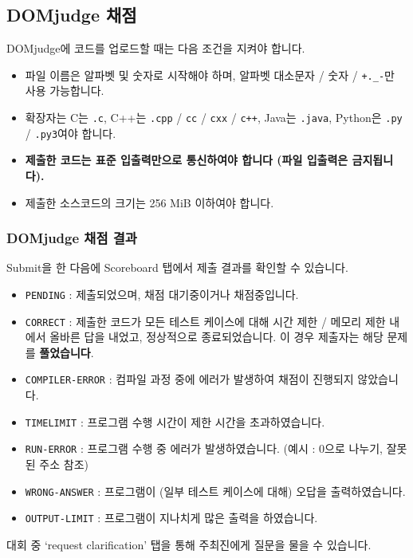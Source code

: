 \subsection*{DOMjudge 채점}
DOMjudge에 코드를 업로드할 때는 다음 조건을 지켜야 합니다.
\begin{itemize}
    \item 파일 이름은 알파벳 및 숫자로 시작해야 하며, 알파벳 대소문자 / 숫자 / \verb|+._-|만 사용 가능합니다.
    \item 확장자는 C는 \verb|.c|, C++는 \verb|.cpp| / \verb|cc| /  \verb|cxx| / \verb|c++|, Java는 \verb|.java|, Python은 \verb|.py| / \verb|.py3|여야 합니다.
    \item \textbf{제출한 코드는 표준 입출력만으로 통신하여야 합니다 (파일 입출력은 금지됩니다).}
    \item 제출한 소스코드의 크기는 256 MiB 이하여야 합니다.
\end{itemize}

\subsubsection*{DOMjudge 채점 결과}
Submit을 한 다음에 Scoreboard 탭에서 제출 결과를 확인할 수 있습니다.
\begin{itemize}
    \item {\color{gray}\texttt{PENDING}} : 제출되었으며, 채점 대기중이거나 채점중입니다.
    \item {\color{my-green}\texttt{CORRECT}} : 제출한 코드가 모든 테스트 케이스에 대해 시간 제한 / 메모리 제한 내에서 올바른 답을 내었고, 정상적으로 종료되었습니다. 이 경우 제출자는 해당 문제를 \textbf{풀었습니다}.
    \item {\color{red}\texttt{COMPILER-ERROR}} : 컴파일 과정 중에 에러가 발생하여 채점이 진행되지 않았습니다.
    \item {\color{red}\texttt{TIMELIMIT}} : 프로그램 수행 시간이 제한 시간을 초과하였습니다.
    \item {\color{red}\texttt{RUN-ERROR}} : 프로그램 수행 중 에러가 발생하였습니다. (예시 : 0으로 나누기, 잘못된 주소 참조)
    \item {\color{red}\texttt{WRONG-ANSWER}} : 프로그램이 (일부 테스트 케이스에 대해) 오답을 출력하였습니다.
    \item {\color{red}\texttt{OUTPUT-LIMIT}} : 프로그램이 지나치게 많은 출력을 하였습니다.
\end{itemize}
대회 중 `request clarification' 탭을 통해 주최진에게 질문을 물을 수 있습니다.
